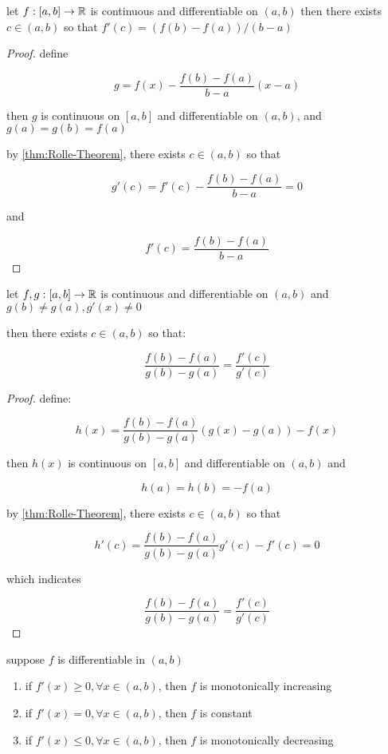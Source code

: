 \begin{thm}
    let $f: [a,b] \to \mathbb{R}$ is continuous and differentiable on $(a,b)$
    then there exists $c \in (a,b)$ so that $f'(c) = (f(b) - f(a))/(b-a)$
\end{thm}

\begin{proof}
    define 

    \[
        g = f(x) - \frac{f(b) - f(a)}{b-a}(x-a)
    \]

    then $g$ is continuous on $[a,b]$ and differentiable on $(a,b)$, and $g(a) = g(b) = f(a)$

    by \autoref{thm:Rolle-Theorem}, there exists $c \in (a,b)$ so that

    \[
        g'(c) = f'(c) - \frac{f(b) - f(a)}{b-a} =  0
    \]

    and 

    \[
        f'(c) = \frac{f(b) - f(a)}{b-a}
    \]
\end{proof}

\begin{thm}
    let $f,g: [a,b] \to \mathbb{R}$ is continuous and differentiable on $(a,b)$
    and $g(b) \ne g(a), g'(x) \ne 0$

    then there exists $c \in (a,b)$ so that:

    \[
        \frac{f(b)- f(a)}{g(b) -g(a)} = \frac{f'(c)}{g'(c)}
    \]
\end{thm}

\begin{proof}
    define:

    \[
        h(x)= \frac{f(b)- f(a)}{g(b) -g(a)}\left( g(x) - g(a) \right) - f(x)
    \]

    then $h(x) $ is continuous on $[a,b]$ and differentiable on $(a,b)$ and

    \[
        h(a) = h(b) = -f(a)
    \]


    by \autoref{thm:Rolle-Theorem}, there exists $c \in (a,b)$ so that

    \[
        h'(c) =\frac{f(b)- f(a)}{g(b) -g(a)} g'(c) - f'(c) = 0 
    \]

    which indicates

    \[
        \frac{f(b)- f(a)}{g(b) -g(a)} = \frac{f'(c)}{g'(c)}
    \]
\end{proof}

\begin{thm}
    suppose $f$ is differentiable in $(a,b)$

    \begin{enumerate}
        \item if $f'(x) \ge 0, \forall x \in (a,b)$, then $f$ is monotonically increasing
        \item if $f'(x) = 0, \forall x \in (a,b)$, then $f$ is constant
        \item if $f'(x) \le 0, \forall x \in (a,b)$, then $f$ is monotonically decreasing
    \end{enumerate}
\end{thm}

